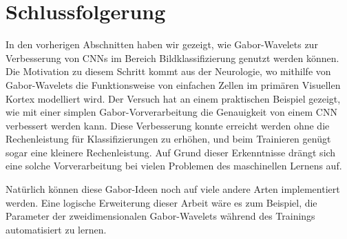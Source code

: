 \section{Schlussfolgerung}

In den vorherigen Abschnitten haben wir gezeigt, wie Gabor-Wavelets zur Verbesserung von CNNs im Bereich Bildklassifizierung genutzt werden können.
Die Motivation zu diesem Schritt kommt aus der Neurologie, wo mithilfe von Gabor-Wavelets die Funktionsweise von einfachen Zellen im primären Visuellen Kortex modelliert wird.
Der Versuch hat an einem praktischen Beispiel gezeigt, wie mit einer simplen Gabor-Vorverarbeitung die Genauigkeit von einem CNN verbessert werden kann.
Diese Verbesserung konnte erreicht werden ohne die Rechenleistung für Klassifizierungen zu erhöhen, und beim Trainieren genügt sogar eine kleinere Rechenleistung.
Auf Grund dieser Erkenntnisse drängt sich eine solche Vorverarbeitung bei vielen Problemen des maschinellen Lernens auf. 

Natürlich können diese Gabor-Ideen noch auf viele andere Arten implementiert werden.
Eine logische Erweiterung dieser Arbeit wäre es zum Beispiel, die Parameter der zweidimensionalen Gabor-Wavelets während des Trainings automatisiert zu lernen.
